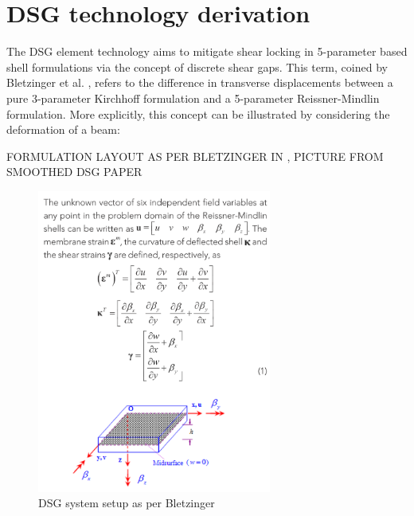 
\chapter{DSG technology derivation}
\label{app:DSG technology derivation}

The DSG element technology aims to mitigate shear locking in 5-parameter based shell formulations via the concept of discrete shear gaps. This term, coined by Bletzinger et al. \cite{Ble00}, refers to the difference in transverse displacements between a pure 3-parameter Kirchhoff formulation and a 5-parameter Reissner-Mindlin formulation. More explicitly, this concept can be illustrated by considering the deformation of a beam:



FORMULATION LAYOUT AS PER BLETZINGER IN \cite{Ble00}, PICTURE FROM SMOOTHED DSG PAPER 

\begin{figure}[H]
	\centering
	\includegraphics[height=10cm]{images/dsg_derivation_CS_layout}
	\caption{DSG system setup as per Bletzinger}
	\label{fig:dsgderivationcslayout}
\end{figure}

